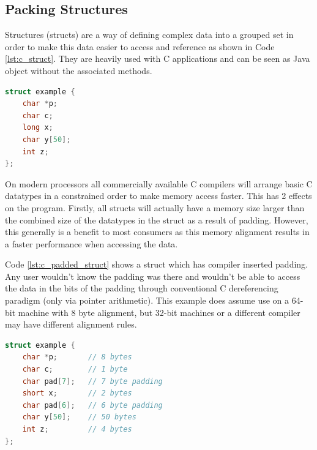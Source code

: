 \documentclass[final_report.tex]{subfiles}
\begin{document}
\subsection{Packing Structures}
Structures (structs) are a way of defining complex data into a grouped set in order to make this data easier to access and reference as shown in Code \ref{lst:c_struct}. They are heavily used with C applications and can be seen as Java object without the associated methods.

\begin{lstlisting}[language=C, caption={Example C Struct}, label=lst:c_struct]
struct example {
    char *p;
    char c;
    long x;
    char y[50];
    int z;
};
\end{lstlisting}

On modern processors all commercially available C compilers will arrange basic C datatypes in a constrained order to make memory access faster. This has 2 effects on the program. Firstly, all structs will actually have a memory size larger than the combined size of the datatypes in the struct as a result of padding. However, this generally is a benefit to most consumers as this memory alignment results in a faster performance when accessing the data.


Code \ref{lst:c_padded_struct} shows a struct which has compiler inserted padding. Any user wouldn't know the padding was there and wouldn't be able to access the data in the bits of the padding through conventional C dereferencing paradigm (only via pointer arithmetic). This example does assume use on a 64-bit machine with 8 byte alignment, but 32-bit machines or a different compiler may have different alignment rules.

\begin{lstlisting}[language=C, caption={Example C Struct with compiler inserted padding}, label=lst:c_padded_struct]
struct example {
    char *p;       // 8 bytes
    char c;        // 1 byte
    char pad[7];   // 7 byte padding
    short x;       // 2 bytes
    char pad[6];   // 6 byte padding
    char y[50];    // 50 bytes
    int z;         // 4 bytes
};
\end{lstlisting}
\end{document}
